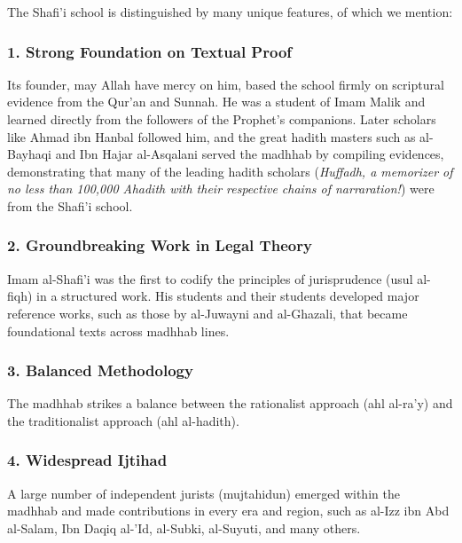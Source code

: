\documentclass[
  a4paper,
  DIV=11,
  numbers=noendperiod]{scrartcl}
\begin{document}
The Shafi'i school is distinguished by many unique features, of which we
mention:

\subsubsection{1. Strong Foundation on Textual
Proof}\label{strong-foundation-on-textual-proof}

Its founder, may Allah have mercy on him, based the school firmly on
scriptural evidence from the Qur'an and Sunnah. He was a student of Imam
Malik and learned directly from the followers of the Prophet's
companions. Later scholars like Ahmad ibn Hanbal followed him, and the
great hadith masters such as al-Bayhaqi and Ibn Hajar al-Asqalani served
the madhhab by compiling evidences, demonstrating that many of the
leading hadith scholars (\emph{Huffadh, a memorizer of no less than
100,000 Ahadith with their respective chains of narraration!}) were from
the Shafi'i school.

\subsubsection{2. Groundbreaking Work in Legal
Theory}\label{groundbreaking-work-in-legal-theory}

Imam al-Shafi'i was the first to codify the principles of jurisprudence
(usul al-fiqh) in a structured work. His students and their students
developed major reference works, such as those by al-Juwayni and
al-Ghazali, that became foundational texts across madhhab lines.

\subsubsection{3. Balanced Methodology}\label{balanced-methodology}

The madhhab strikes a balance between the rationalist approach (ahl
al-ra'y) and the traditionalist approach (ahl al-hadith).

\subsubsection{4. Widespread Ijtihad}\label{widespread-ijtihad}

A large number of independent jurists (mujtahidun) emerged within the
madhhab and made contributions in every era and region, such as al-Izz
ibn Abd al-Salam, Ibn Daqiq al-'Id, al-Subki, al-Suyuti, and many
others.
\end{document}
